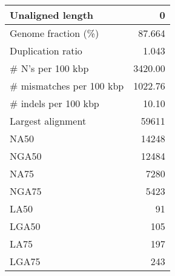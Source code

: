 \documentclass[12pt,a4paper]{article}
\begin{document}
\begin{table}[ht]
\begin{center}
\begin{tabular}{|l*{1}{|r}|}
Unaligned length & 0 \\ \hline
Genome fraction (\%) & 87.664 \\ \hline
Duplication ratio & 1.043 \\ \hline
\# N's per 100 kbp & 3420.00 \\ \hline
\# mismatches per 100 kbp & 1022.76 \\ \hline
\# indels per 100 kbp & 10.10 \\ \hline
Largest alignment & 59611 \\ \hline
NA50 & 14248 \\ \hline
NGA50 & 12484 \\ \hline
NA75 & 7280 \\ \hline
NGA75 & 5423 \\ \hline
LA50 & 91 \\ \hline
LGA50 & 105 \\ \hline
LA75 & 197 \\ \hline
LGA75 & 243 \\ \hline
\end{tabular}
\end{center}
\end{table}
\end{document}
